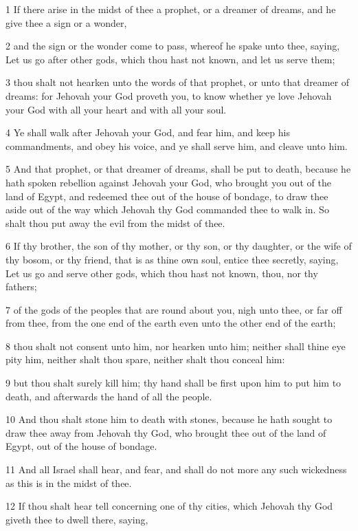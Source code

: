 \par 1 If there arise in the midst of thee a prophet, or a dreamer of dreams, and he give thee a sign or a wonder,
\par 2 and the sign or the wonder come to pass, whereof he spake unto thee, saying, Let us go after other gods, which thou hast not known, and let us serve them;
\par 3 thou shalt not hearken unto the words of that prophet, or unto that dreamer of dreams: for Jehovah your God proveth you, to know whether ye love Jehovah your God with all your heart and with all your soul.
\par 4 Ye shall walk after Jehovah your God, and fear him, and keep his commandments, and obey his voice, and ye shall serve him, and cleave unto him.
\par 5 And that prophet, or that dreamer of dreams, shall be put to death, because he hath spoken rebellion against Jehovah your God, who brought you out of the land of Egypt, and redeemed thee out of the house of bondage, to draw thee aside out of the way which Jehovah thy God commanded thee to walk in. So shalt thou put away the evil from the midst of thee.
\par 6 If thy brother, the son of thy mother, or thy son, or thy daughter, or the wife of thy bosom, or thy friend, that is as thine own soul, entice thee secretly, saying, Let us go and serve other gods, which thou hast not known, thou, nor thy fathers;
\par 7 of the gods of the peoples that are round about you, nigh unto thee, or far off from thee, from the one end of the earth even unto the other end of the earth;
\par 8 thou shalt not consent unto him, nor hearken unto him; neither shall thine eye pity him, neither shalt thou spare, neither shalt thou conceal him:
\par 9 but thou shalt surely kill him; thy hand shall be first upon him to put him to death, and afterwards the hand of all the people.
\par 10 And thou shalt stone him to death with stones, because he hath sought to draw thee away from Jehovah thy God, who brought thee out of the land of Egypt, out of the house of bondage.
\par 11 And all Israel shall hear, and fear, and shall do not more any such wickedness as this is in the midst of thee.
\par 12 If thou shalt hear tell concerning one of thy cities, which Jehovah thy God giveth thee to dwell there, saying,
